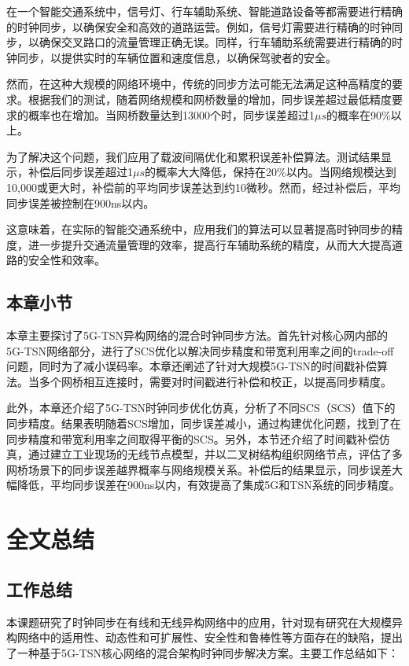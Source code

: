\documentclass[UTF8,a4paper,12pt]{ctexart}
\numberwithin{equation}{section}
\begin{document}
	在一个智能交通系统中，信号灯、行车辅助系统、智能道路设备等都需要进行精确的时钟同步，以确保安全和高效的道路运营。例如，信号灯需要进行精确的时钟同步，以确保交叉路口的流量管理正确无误。同样，行车辅助系统需要进行精确的时钟同步，以提供实时的车辆位置和速度信息，以确保驾驶者的安全。
	
	然而，在这种大规模的网络环境中，传统的同步方法可能无法满足这种高精度的要求。根据我们的测试，随着网络规模和网桥数量的增加，同步误差超过最低精度要求的概率也在增加。当网桥数量达到13000个时，同步误差超过1$\mu s$的概率在90\%以上。
	
	为了解决这个问题，我们应用了载波间隔优化和累积误差补偿算法。测试结果显示，补偿后同步误差超过1$\mu s$的概率大大降低，保持在20\%以内。当网络规模达到10,000或更大时，补偿前的平均同步误差达到约10微秒。然而，经过补偿后，平均同步误差被控制在900ns以内。
	
	这意味着，在实际的智能交通系统中，应用我们的算法可以显著提高时钟同步的精度，进一步提升交通流量管理的效率，提高行车辅助系统的精度，从而大大提高道路的安全性和效率。
	
	
	\subsection{本章小节}
	本章主要探讨了5G-TSN异构网络的混合时钟同步方法。首先针对核心网内部的5G-TSN网络部分，进行了SCS优化以解决同步精度和带宽利用率之间的trade-off问题，同时为了减小误码率。本章还阐述了针对大规模5G-TSN的时间戳补偿算法。当多个网桥相互连接时，需要对时间戳进行补偿和校正，以提高同步精度。
	
	此外，本章还介绍了5G-TSN时钟同步优化仿真，分析了不同SCS（SCS）值下的同步精度。结果表明随着SCS增加，同步误差减小，通过构建优化问题，找到了在同步精度和带宽利用率之间取得平衡的SCS。另外，本节还介绍了时间戳补偿仿真，通过建立工业现场的无线节点模型，并以二叉树结构组织网络节点，评估了多网桥场景下的同步误差越界概率与网络规模关系。补偿后的结果显示，同步误差大幅降低，平均同步误差在900ns以内，有效提高了集成5G和TSN系统的同步精度。
	
	
	
	\newpage
	\section{全文总结}
	
	\subsection{工作总结}
	本课题研究了时钟同步在有线和无线异构网络中的应用，针对现有研究在大规模异构网络中的适用性、动态性和可扩展性、安全性和鲁棒性等方面存在的缺陷，提出了一种基于5G-TSN核心网络的混合架构时钟同步解决方案。主要工作总结如下：
	
\end{document}
